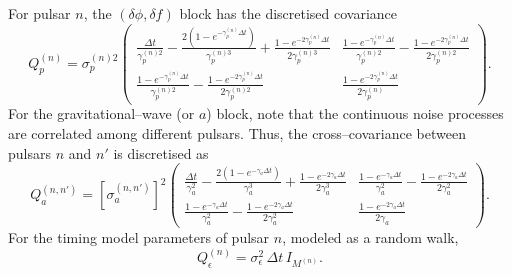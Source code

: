 \documentclass[]{scrartcl}
\begin{document}
	For pulsar $n$, the \((\delta\phi,\delta f)\) block has the discretised covariance
	\begin{equation}
		Q_p^{(n)} = \sigma_p^{(n)2}\begin{pmatrix}
			\displaystyle \frac{\Delta t}{\gamma_p^{(n)2}} - \frac{2\left(1-e^{-\gamma_p^{(n)}\Delta t}\right)}{\gamma_p^{(n)3}} + \frac{1-e^{-2\gamma_p^{(n)}\Delta t}}{2\gamma_p^{(n)3}} & \displaystyle \frac{1-e^{-\gamma_p^{(n)}\Delta t}}{\gamma_p^{(n)2}} - \frac{1-e^{-2\gamma_p^{(n)}\Delta t}}{2\gamma_p^{(n)2}}\\[2mm]
			\displaystyle \frac{1-e^{-\gamma_p^{(n)}\Delta t}}{\gamma_p^{(n)2}} - \frac{1-e^{-2\gamma_p^{(n)}\Delta t}}{2\gamma_p^{(n)2}} & \displaystyle \frac{1-e^{-2\gamma_p^{(n)}\Delta t}}{2\gamma_p^{(n)}}
		\end{pmatrix}.
	\end{equation}
	For the gravitational--wave (or \(a\)) block, note that the continuous noise processes are correlated among different pulsars. Thus, the cross–covariance between pulsars $n$ and $n'$ is discretised as
	\begin{equation}
		Q_a^{(n,n')} = \left[\sigma_a^{(n,n')}\right]^2\begin{pmatrix}
			\displaystyle \frac{\Delta t}{\gamma_a^2} - \frac{2\left(1-e^{-\gamma_a\Delta t}\right)}{\gamma_a^3} + \frac{1-e^{-2\gamma_a\Delta t}}{2\gamma_a^3} & \displaystyle \frac{1-e^{-\gamma_a\Delta t}}{\gamma_a^2} - \frac{1-e^{-2\gamma_a\Delta t}}{2\gamma_a^2}\\[2mm]
			\displaystyle \frac{1-e^{-\gamma_a\Delta t}}{\gamma_a^2} - \frac{1-e^{-2\gamma_a\Delta t}}{2\gamma_a^2} & \displaystyle \frac{1-e^{-2\gamma_a\Delta t}}{2\gamma_a}
		\end{pmatrix}.
	\end{equation}
	For the timing model parameters of pulsar $n$, modeled as a random walk,
	\begin{equation}
		Q_\epsilon^{(n)} = \sigma_\epsilon^2\,\Delta t\,I_{M^{(n)}}.
	\end{equation}
	
\end{document}
